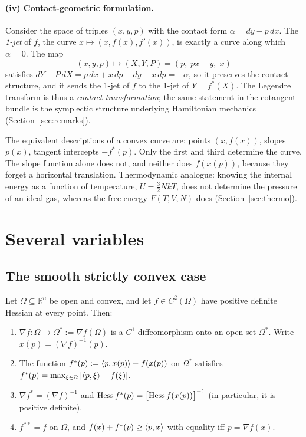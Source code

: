 \paragraph{(iv) Contact-geometric formulation.}
Consider the space of triples $(x,y,p)$ with the contact form
$\alpha=d y-p\,d x$.  The \emph{1-jet} of $f$, the curve
$x\mapsto(x,f(x),f'(x))$, is exactly a curve along which $\alpha=0$.  The map
\[
  (x,y,p)\longmapsto (X,Y,P)=(p,\;px-y,\;x)
\]
satisfies $d Y-P\,d X=p\,d x+x\,d p-d y-x\,d p=-\alpha$, so it
preserves the contact structure, and it sends the 1-jet of $f$ to the 1-jet of
$Y=f^*(X)$.  The Legendre transform is thus a \emph{contact transformation};
the same statement in the cotangent bundle is the symplectic structure
underlying Hamiltonian mechanics (Section~\ref{sec:remarks}).

\begin{remark}
The equivalent descriptions of a convex curve are: points $(x,f(x))$,
slopes $p(x)$, tangent intercepts $-f^*(p)$.  Only the first and third
determine the curve.  The slope function alone does not, and neither does
$f(x(p))$, because they forget a horizontal translation.  Thermodynamic
analogue: knowing the internal energy as a function of temperature,
$U=\tfrac32NkT$, does not determine the pressure of an ideal gas,
whereas the free energy $F(T,V,N)$ does (Section~\ref{sec:thermo}).
\end{remark}

\section{Several variables}\label{sec:nd}

\subsection{The smooth strictly convex case}

\begin{theorem}\label{thm:nd}
Let $\Omega\subseteq\mathbb{R}^n$ be open and convex, and let $f\in C^2(\Omega)$ have
positive definite Hessian at every point.  Then:
\begin{enumerate}[label=(\roman*),nosep]
  \item $\nabla f\colon\Omega\to\Omega^*:=\nabla f(\Omega)$ is a
        $C^1$-diffeomorphism onto an open set $\Omega^*$.  Write
        $x(p)=(\nabla f)^{-1}(p)$.
  \item The function $f^*(p):=\langle p,x(p)\rangle-f(x(p))$ on $\Omega^*$ satisfies
        $f^*(p)=\max_{\xi\in\Omega}\,[\langle p,\xi\rangle-f(\xi)]$.
  \item $\nabla f^*=(\nabla f)^{-1}$ and
        $\operatorname{Hess} f^*(p)=\bigl[\operatorname{Hess} f(x(p))\bigr]^{-1}$ (in particular, it is
        positive definite).
  \item $f^{**}=f$ on $\Omega$, and $f(x)+f^*(p)\ge\langle p,x\rangle$ with equality iff
        $p=\nabla f(x)$.
\end{enumerate}
\end{theorem}

